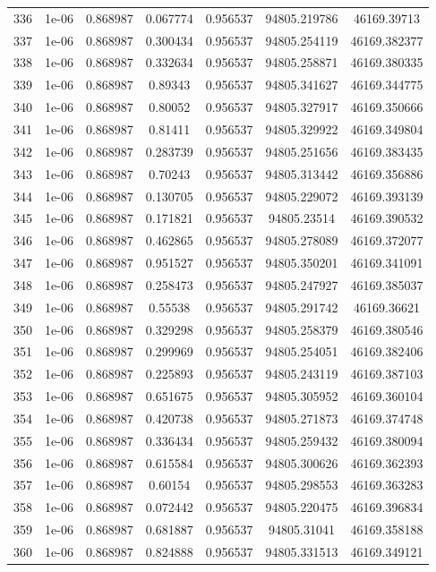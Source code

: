 \begin{table}
\begin{tabular*}{\linewidth}{c|c|c|c|c|c|c}
336 & 1e-06 & 0.868987 & 0.067774 & 0.956537 & 94805.219786 & 46169.39713\\
337 & 1e-06 & 0.868987 & 0.300434 & 0.956537 & 94805.254119 & 46169.382377\\
338 & 1e-06 & 0.868987 & 0.332634 & 0.956537 & 94805.258871 & 46169.380335\\
339 & 1e-06 & 0.868987 & 0.89343 & 0.956537 & 94805.341627 & 46169.344775\\
340 & 1e-06 & 0.868987 & 0.80052 & 0.956537 & 94805.327917 & 46169.350666\\
341 & 1e-06 & 0.868987 & 0.81411 & 0.956537 & 94805.329922 & 46169.349804\\
342 & 1e-06 & 0.868987 & 0.283739 & 0.956537 & 94805.251656 & 46169.383435\\
343 & 1e-06 & 0.868987 & 0.70243 & 0.956537 & 94805.313442 & 46169.356886\\
344 & 1e-06 & 0.868987 & 0.130705 & 0.956537 & 94805.229072 & 46169.393139\\
345 & 1e-06 & 0.868987 & 0.171821 & 0.956537 & 94805.23514 & 46169.390532\\
346 & 1e-06 & 0.868987 & 0.462865 & 0.956537 & 94805.278089 & 46169.372077\\
347 & 1e-06 & 0.868987 & 0.951527 & 0.956537 & 94805.350201 & 46169.341091\\
348 & 1e-06 & 0.868987 & 0.258473 & 0.956537 & 94805.247927 & 46169.385037\\
349 & 1e-06 & 0.868987 & 0.55538 & 0.956537 & 94805.291742 & 46169.36621\\
350 & 1e-06 & 0.868987 & 0.329298 & 0.956537 & 94805.258379 & 46169.380546\\
351 & 1e-06 & 0.868987 & 0.299969 & 0.956537 & 94805.254051 & 46169.382406\\
352 & 1e-06 & 0.868987 & 0.225893 & 0.956537 & 94805.243119 & 46169.387103\\
353 & 1e-06 & 0.868987 & 0.651675 & 0.956537 & 94805.305952 & 46169.360104\\
354 & 1e-06 & 0.868987 & 0.420738 & 0.956537 & 94805.271873 & 46169.374748\\
355 & 1e-06 & 0.868987 & 0.336434 & 0.956537 & 94805.259432 & 46169.380094\\
356 & 1e-06 & 0.868987 & 0.615584 & 0.956537 & 94805.300626 & 46169.362393\\
357 & 1e-06 & 0.868987 & 0.60154 & 0.956537 & 94805.298553 & 46169.363283\\
358 & 1e-06 & 0.868987 & 0.072442 & 0.956537 & 94805.220475 & 46169.396834\\
359 & 1e-06 & 0.868987 & 0.681887 & 0.956537 & 94805.31041 & 46169.358188\\
360 & 1e-06 & 0.868987 & 0.824888 & 0.956537 & 94805.331513 & 46169.349121\\
\end{tabular*}
\end{table}
